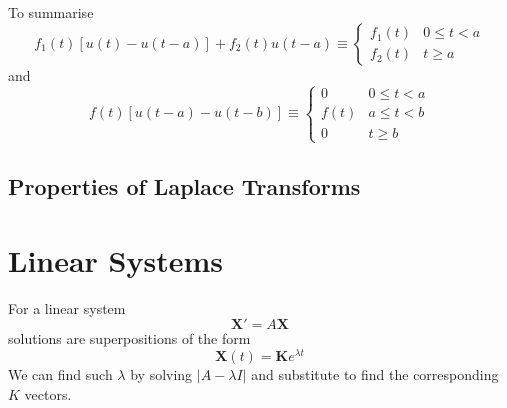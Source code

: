 \documentclass{article}
\begin{document}
To summarise
\begin{equation*}
    f_1\left( t \right) \left[ u\left( t \right) - u\left( t - a \right) \right] + f_2\left( t \right) u\left( t - a \right)
    \equiv
    \begin{cases}
        f_1\left( t \right) & 0 \leq t < a \\
        f_2\left( t \right) & t \geq a
    \end{cases}
\end{equation*}
and
\begin{equation*}
    f\left( t \right) \left[ u\left( t - a \right) - u\left( t - b \right) \right]
    \equiv
    \begin{cases}
        0                 & 0 \leq t < a \\
        f\left( t \right) & a \leq t < b \\
        0                 & t \geq b
    \end{cases}
\end{equation*}
\subsection{Properties of Laplace Transforms}

\newpage
\section{Linear Systems}
For a linear system
\[
    \mathbf{X}'=A\mathbf{X}
\]
solutions are superpositions of the form
\[
    \mathbf{X}(t)=\mathbf{K}e^{\lambda t}
\]
We can find such \(\lambda\) by solving
\(\left|A-\lambda I\right|\) and substitute to find the corresponding \(K\) vectors.
\end{document}
